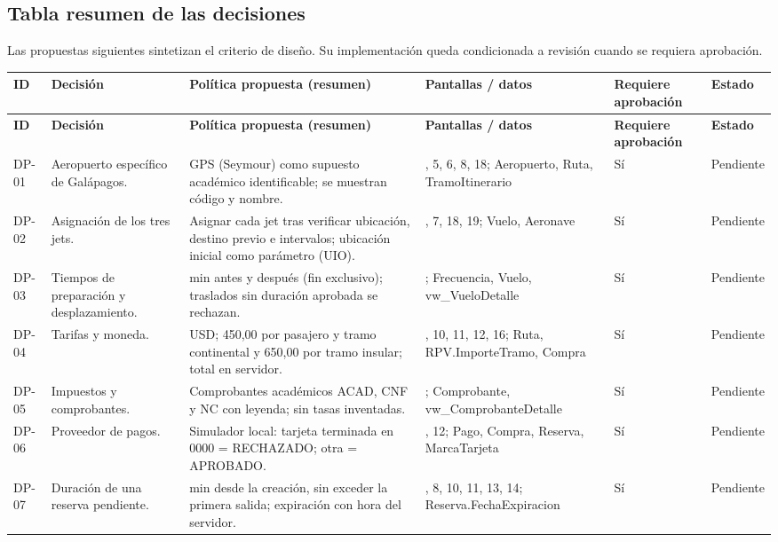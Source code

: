 \documentclass[11pt,a4paper]{article}
\renewcommand{\arraystretch}{1.23}
\begin{document}
\subsection{Tabla resumen de las decisiones}
Las propuestas siguientes sintetizan el criterio de diseño. Su implementación queda condicionada a revisión cuando se requiera aprobación.
\footnotesize
\setlength{\tabcolsep}{4pt}
\renewcommand{\arraystretch}{1.18}
\begin{longtable}{@{}>{\raggedright\arraybackslash}p{1.05cm}>{\raggedright\arraybackslash}p{2.55cm}>{\raggedright\arraybackslash}p{4.5cm}>{\raggedright\arraybackslash}p{3.65cm}>{\raggedright\arraybackslash}p{1.45cm}>{\raggedright\arraybackslash}p{1.45cm}@{}}
\toprule
\textbf{ID} & \textbf{Decisión} & \textbf{Política propuesta (resumen)} & \textbf{Pantallas / datos} & \textbf{Requiere aprobación} & \textbf{Estado}\\\midrule\endfirsthead
\toprule\textbf{ID} & \textbf{Decisión} & \textbf{Política propuesta (resumen)} & \textbf{Pantallas / datos} & \textbf{Requiere aprobación} & \textbf{Estado}\\\midrule\endhead
DP-01 & Aeropuerto específico de Galápagos. & GPS (Seymour) como supuesto académico identificable; se muestran código y nombre. & 1, 5, 6, 8, 18; Aeropuerto, Ruta, TramoItinerario & Sí & Pendiente\\
DP-02 & Asignación de los tres jets. & Asignar cada jet tras verificar ubicación, destino previo e intervalos; ubicación inicial como parámetro (UIO). & 6, 7, 18, 19; Vuelo, Aeronave & Sí & Pendiente\\
DP-03 & Tiempos de preparación y desplazamiento. & 30 min antes y después (fin exclusivo); traslados sin duración aprobada se rechazan. & 18; Frecuencia, Vuelo, vw\_VueloDetalle & Sí & Pendiente\\
DP-04 & Tarifas y moneda. & USD; 450,00 por pasajero y tramo continental y 650,00 por tramo insular; total en servidor. & 6, 10, 11, 12, 16; Ruta, RPV.ImporteTramo, Compra & Sí & Pendiente\\
DP-05 & Impuestos y comprobantes. & Comprobantes académicos ACAD, CNF y NC con leyenda; sin tasas inventadas. & 16; Comprobante, vw\_ComprobanteDetalle & Sí & Pendiente\\
DP-06 & Proveedor de pagos. & Simulador local: tarjeta terminada en 0000 = RECHAZADO; otra = APROBADO. & 11, 12; Pago, Compra, Reserva, MarcaTarjeta & Sí & Pendiente\\
DP-07 & Duración de una reserva pendiente. & 30 min desde la creación, sin exceder la primera salida; expiración con hora del servidor. & 7, 8, 10, 11, 13, 14; Reserva.FechaExpiracion & Sí & Pendiente\\

\end{longtable}
\end{document}
